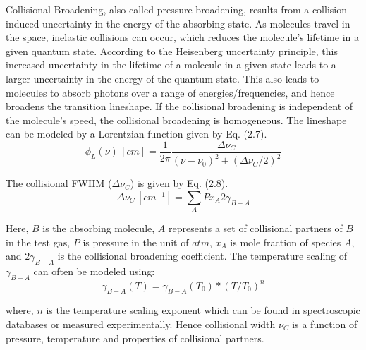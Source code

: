\vspace{3mm}

Collisional Broadening, also called pressure broadening, results from a collision-induced uncertainty in the energy of the absorbing state. As molecules travel in the space, inelastic collisions can occur, which reduces the molecule's lifetime in a given quantum state. According to the Heisenberg uncertainty principle, this increased uncertainty in the lifetime of a molecule in a given state leads to a larger uncertainty in the energy of the quantum state. This also leads to molecules to absorb photons over a range of energies/frequencies, and hence broadens the transition lineshape. If the collisional broadening is independent of the molecule's speed, the collisional broadening is homogeneous. The lineshape can be modeled by a Lorentzian function given by Eq. (2.7). 
\begin{equation}\label{}
\phi_L(\nu) \,[cm]=\frac{1}{2\pi}\frac{\Delta\nu_C}{(\nu-\nu_0)^2+(\Delta\nu_C/2)^2}
\end{equation}

\vspace{3mm}

\noindent The collisional FWHM ($\Delta\nu_C$) is given by Eq. (2.8).
\begin{equation}\label{}
\Delta\nu_C \,[cm^{-1}]=\sum_A Px_A2\gamma_{B-A} 
\end{equation}

\noindent Here, $B$ is the absorbing molecule, $A$ represents a set of collisional partners of $B$ in the test gas, $P$ is pressure in the unit of $atm$, $x_A$ is mole fraction of species $A$, and $2\gamma_{B-A}$ is the collisional broadening coefficient. The temperature scaling of $\gamma_{B-A}$ can often be modeled using:
\begin{equation}\label{}
\gamma_{B-A}(T)=\gamma_{B-A}(T_0)*(T/T_0)^{n}
\end{equation}

\noindent where, $n$ is the temperature scaling exponent which can be found in spectroscopic databases or measured experimentally. Hence collisional width $\nu_C$ is a function of pressure, temperature and properties of collisional partners.

